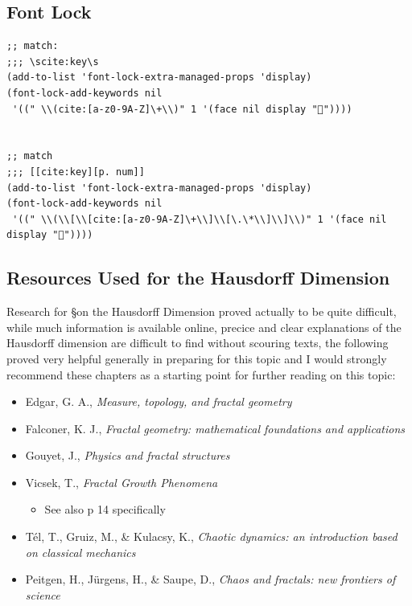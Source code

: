 \documentclass[a4paper,11pt,twoside]{article}
\begin{document}
\subsection{Font Lock}
\label{sec:orgbce4767}
\begin{verbatim}
;; match:
;;; \scite:key\s
(add-to-list 'font-lock-extra-managed-props 'display)
(font-lock-add-keywords nil
 '((" \\(cite:[a-z0-9A-Z]\+\\)" 1 '(face nil display "🤔"))))


;; match
;;; [[cite:key][p. num]]
(add-to-list 'font-lock-extra-managed-props 'display)
(font-lock-add-keywords nil
 '((" \\(\\[\\[cite:[a-z0-9A-Z]\+\\]\\[\.\*\\]\\]\\)" 1 '(face nil display "🤔"))))
\end{verbatim}
\subsection{Resources Used for the Hausdorff Dimension}
\label{haus-resource}
Research for \S on the Hausdorff Dimension proved actually to be quite difficult, while much information is available online, precice and clear explanations of the Hausdorff dimension are difficult to find without scouring texts, the following proved very helpful generally in preparing for this topic and I would strongly recommend these chapters as a starting point for further reading on this topic:

\begin{itemize}
\item Edgar, G. A., \emph{Measure, topology, and fractal geometry} \cite[Ch. 6]{edgarMeasureTopologyFractal2008a}
\item Falconer, K. J., \emph{Fractal geometry: mathematical foundations and applications}  \cite[Ch. 2]{falconerFractalGeometryMathematical2003b}
\item Gouyet, J., \emph{Physics and fractal structures} \cite[\S1.3]{gouyetPhysicsFractalStructures1996}
\item Vicsek, T., \emph{Fractal Growth Phenomena} \cite[Ch. 4]{vicsekFractalGrowthPhenomena1992}
\begin{itemize}
\item See also p 14 specifically
\end{itemize}
\item Tél, T., Gruiz, M., \& Kulacsy, K., \emph{Chaotic dynamics: an introduction based on classical mechanics}  \cite[\S2.1.2]{telChaoticDynamicsIntroduction2006}
\item Peitgen, H., Jürgens, H., \& Saupe, D., \emph{Chaos and fractals: new frontiers of science}  \cite[\S 4.3]{peitgenChaosFractalsNew2004}
\end{itemize}
\end{document}

